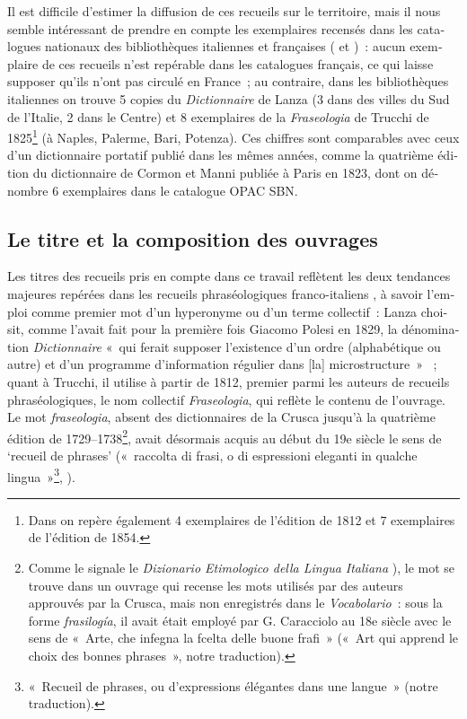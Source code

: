 \documentclass[output=paper,booklanguage=french]{langscibook}
\begin{document}
\begin{otherlanguage}{french}
Il est difficile d’estimer la diffusion de ces recueils sur le territoire, mais il nous semble intéressant de prendre en compte les exemplaires recensés dans les catalogues nationaux des bibliothèques italiennes et françaises (\citep{[OPAC-SBN]} et \citep{[CCF]})~: aucun exemplaire de ces recueils n’est repérable dans les catalogues français, ce qui laisse supposer qu’ils n’ont pas circulé en France~; au contraire, dans les bibliothèques italiennes on trouve 5 copies du \emph{Dictionnaire} de Lanza (3 dans des villes du Sud de l’Italie, 2 dans le Centre) et 8 exemplaires de la \emph{Fraseologia} de Trucchi de 1825\footnote{Dans \citep{[OPAC-SBN]} on repère également 4 exemplaires de l’édition de 1812 et 7 exemplaires de l’édition de 1854. } (à Naples, Palerme, Bari, Potenza). Ces chiffres sont comparables avec ceux d’un dictionnaire portatif publié dans les mêmes années, comme la quatrième édition du dictionnaire de Cormon et Manni publiée à Paris en 1823, dont on dénombre 6 exemplaires dans le catalogue OPAC SBN.

\subsection{Le titre et la composition des ouvrages}

Les titres des recueils pris en compte dans ce travail reflètent les deux tendances majeures repérées dans les recueils phraséologiques franco-italiens \citep[174]{Murano2017}, à savoir l’emploi comme premier mot d’un hyperonyme ou d’un terme collectif~: Lanza choisit, comme l’avait fait pour la première fois Giacomo Polesi en 1829, la dénomination \emph{Dictionnaire} «~qui ferait supposer l’existence d’un ordre (alphabétique ou autre) et d’un programme d’information régulier dans [la] microstructure~» \citep[174]{Murano2017}~; quant à Trucchi, il utilise à partir de 1812, premier parmi les auteurs de recueils phraséologiques, le nom collectif \emph{Fraseologia}, qui reflète le contenu de l’ouvrage. Le mot \emph{fraseologia}, absent des dictionnaires de la Crusca jusqu’à la quatrième édition de 1729--1738\footnote{Comme le signale le \emph{Dizionario Etimologico della Lingua Italiana} \citep{CortelazzoZolli1980}), le mot se trouve dans un ouvrage \citep{Bergantini1745} qui recense les mots utilisés par des auteurs approuvés par la Crusca, mais non enregistrés dans le \emph{Vocabolario}~: sous la forme \emph{frasilogía}, il avait était employé par G. Caracciolo au 18e siècle avec le sens de «~Arte, che infegna la fcelta delle buone frafi~» («~Art qui apprend le choix des bonnes phrases~», notre traduction).}, avait désormais acquis au début du 19e siècle le sens de ‘recueil de phrases’ («~raccolta di frasi, o di espressioni eleganti in qualche lingua~»\footnote{«~Recueil de phrases, ou d’expressions élégantes dans une langue~» (notre traduction).}, \citep{Bonavilla1819}).


\end{otherlanguage}
\end{document}
